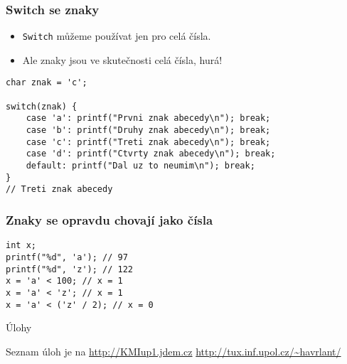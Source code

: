 \documentclass{beamer}
\begin{document}
\begin{frame}[t,fragile]\frametitle{Switch se znaky} 
  \begin{itemize}
    \item \texttt{Switch} můžeme používat jen pro celá čísla.
    \item Ale znaky jsou ve skutečnosti celá čísla, hurá!
  \end{itemize}
  \begin{verbatim} 
char znak = 'c';

switch(znak) {
    case 'a': printf("Prvni znak abecedy\n"); break;
    case 'b': printf("Druhy znak abecedy\n"); break;
    case 'c': printf("Treti znak abecedy\n"); break;
    case 'd': printf("Ctvrty znak abecedy\n"); break;
    default: printf("Dal uz to neumim\n"); break;
}
// Treti znak abecedy
  \end{verbatim}
\end{frame}



\begin{frame}[t,fragile]\frametitle{Znaky se opravdu chovají jako čísla} 
  \begin{verbatim} 
int x;
printf("%d", 'a'); // 97
printf("%d", 'z'); // 122
x = 'a' < 100; // x = 1
x = 'a' < 'z'; // x = 1
x = 'a' < ('z' / 2); // x = 0
  \end{verbatim}
\end{frame}


\begin{frame}[t,fragile]{Úlohy}
\begin{center}
\vskip 1cm
{\Large Seznam úloh je na \url{http://KMIup1.jdem.cz}}
\vskip 2cm
\url{http://tux.inf.upol.cz/~havrlant/}
\end{center}
\end{frame}
\end{document}
